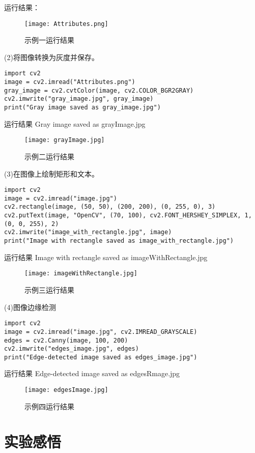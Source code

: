 \documentclass[a4paper, 12pt]{article}
\begin{document}
运行结果：
\begin{figure}[htbp]
    \centering
    \texttt{[image: Attributes.png]}  %
    \caption{示例一运行结果}  %
\end{figure}

(2)将图像转换为灰度并保存。
\begin{verbatim}
import cv2
image = cv2.imread("Attributes.png")
gray_image = cv2.cvtColor(image, cv2.COLOR_BGR2GRAY)
cv2.imwrite("gray_image.jpg", gray_image)
print("Gray image saved as gray_image.jpg")
\end{verbatim}

运行结果{\color{blue}
Gray image saved as grayImage.jpg
}
\begin{figure}[htbp]
    \centering
    \texttt{[image: grayImage.jpg]}  %
    \caption{示例二运行结果}  %
\end{figure}

(3)在图像上绘制矩形和文本。
\begin{verbatim}
import cv2
image = cv2.imread("image.jpg")
cv2.rectangle(image, (50, 50), (200, 200), (0, 255, 0), 3)
cv2.putText(image, "OpenCV", (70, 100), cv2.FONT_HERSHEY_SIMPLEX, 1, (0, 0, 255), 2)
cv2.imwrite("image_with_rectangle.jpg", image)
print("Image with rectangle saved as image_with_rectangle.jpg")
\end{verbatim}

运行结果{\color{blue}
Image with rectangle saved as imageWithRectangle.jpg
}
\begin{figure}[htbp]
    \centering
    \texttt{[image: imageWithRectangle.jpg]}  %
    \caption{示例三运行结果}  %
\end{figure}

(4)图像边缘检测
\begin{verbatim}
import cv2
image = cv2.imread("image.jpg", cv2.IMREAD_GRAYSCALE)
edges = cv2.Canny(image, 100, 200)
cv2.imwrite("edges_image.jpg", edges)
print("Edge-detected image saved as edges_image.jpg")
\end{verbatim}

运行结果{\color{blue}
Edge-detected image saved as edgesRmage.jpg
}
\begin{figure}[htbp]
    \centering
    \texttt{[image: edgesImage.jpg]}  %
    \caption{示例四运行结果}  %
\end{figure}


\section{实验感悟}
\end{document}
